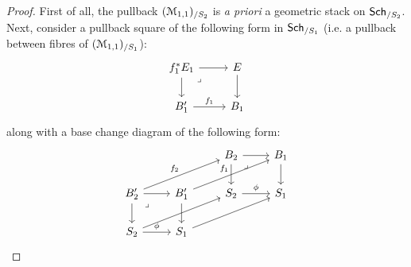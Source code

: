                         \begin{proof}
                            First of all, the pullback $(\mathcal{M}_{1, 1})_{/S_2}$ is \textit{a priori} a geometric stack on $\mathsf{Sch}_{/S_2}$. Next, consider a pullback square of the following form in $\mathsf{Sch}_{/S_1}$ (i.e. a pullback between fibres of $(\mathcal{M}_{1, 1})_{/S_1}$):
                                $$
                                    \begin{tikzcd}
                                    	{f_1^* E_1} & E \\
                                    	{B_1'} & {B_1}
                                    	\arrow["{f_1}", from=2-1, to=2-2]
                                    	\arrow[from=1-2, to=2-2]
                                    	\arrow[from=1-1, to=1-2]
                                    	\arrow[from=1-1, to=2-1]
                                    	\arrow["\lrcorner"{anchor=center, pos=0.125}, draw=none, from=1-1, to=2-2]
                                    \end{tikzcd}
                                $$
                            along with a base change diagram of the following form:
                                $$
                                    \begin{tikzcd}
                                    	&& {B_2} & {B_1} \\
                                    	{B_2'} & {B'_1} & {S_2} & {S_1} \\
                                    	{S_2} & {S_1}
                                    	\arrow["\phi", from=3-1, to=3-2]
                                    	\arrow[from=2-2, to=3-2]
                                    	\arrow[from=2-1, to=2-2]
                                    	\arrow[from=2-1, to=3-1]
                                    	\arrow["\lrcorner"{anchor=center, pos=0.125}, draw=none, from=2-1, to=3-2]
                                    	\arrow["\phi", from=2-3, to=2-4]
                                    	\arrow[from=3-2, to=2-4]
                                    	\arrow[from=3-1, to=2-3]
                                    	\arrow["{f_2}", from=2-1, to=1-3]
                                    	\arrow["{f_1}", from=2-2, to=1-4]
                                    	\arrow[from=1-3, to=1-4]
                                    	\arrow[from=1-4, to=2-4]
                                    	\arrow[from=1-3, to=2-3]
                                    	\arrow["\lrcorner"{anchor=center, pos=0.125}, draw=none, from=1-3, to=2-4]
                                    \end{tikzcd}
$$
\end{proof}
